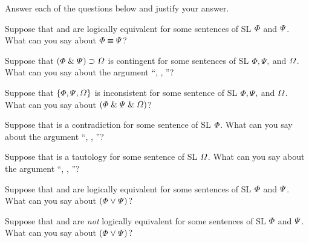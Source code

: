 \solutions
\problempart
\label{pr.TT.concepts}
Answer each of the questions below and justify your answer.
\begin{earg}
\item Suppose that \metaA{} and \metaB{} are logically equivalent for some sentences of SL $\varPhi$ and $\varPsi$. What can you say about $\varPhi{}\equiv\varPsi{}$?
\item Suppose that $(\varPhi{}\mathrel\&\varPsi{})\supset\varOmega{}$ is contingent for some sentences of SL $\varPhi, \varPsi,$ and $\varOmega$. What can you say about the argument ``\metaA{}, \metaB{}, \therefore\metaC{}''?
\item Suppose that $\{\varPhi{},\varPsi{}, \varOmega{}\}$ is inconsistent for some sentence of SL $\varPhi, \varPsi,$ and $\varOmega$. What can you say about $(\varPhi{}\mathrel\&\varPsi{}\mathrel\&\varOmega{})$?
\item Suppose that \metaA{} is a contradiction for some sentence of SL $\varPhi$. What can you say about the argument ``\metaA{}, \metaB{}, \therefore\metaC{}''?
\item Suppose that \metaC{} is a tautology for some sentence of SL $\varOmega$. What can you say about the argument ``\metaA{}, \metaB{}, \therefore\metaC{}''?
  \item Suppose that \metaA{} and \metaB{} are logically equivalent for some sentences of SL $\varPhi$ and $\varPsi$. What can you say about $(\varPhi{}\mkern1mu\vee\mkern1mu\varPsi{})$?
\item Suppose that \metaA{} and \metaB{} are \emph{not} logically equivalent for some sentences of SL $\varPhi$ and $\varPsi$. What can you say about $(\varPhi{}\mkern1mu\vee\mkern1mu\varPsi{})$?
\end{earg}

